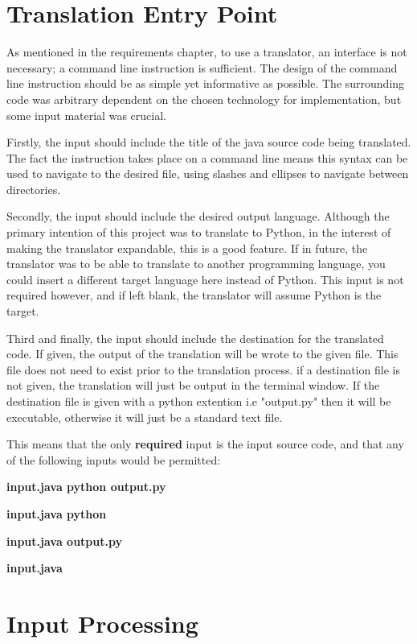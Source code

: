 \documentclass{l4proj}
\begin{document}
\section{Translation Entry Point}
As mentioned in the requirements chapter, to use a translator, an interface is not necessary; a command line instruction is sufficient. The design of the command line instruction should be as simple yet informative as possible. The surrounding code was arbitrary dependent on the chosen technology for implementation, but some input material was crucial. 

Firstly, the input should include the title of the java source code being translated. The fact the instruction takes place on a command line means this syntax can be used to navigate to the desired file, using slashes and ellipses to navigate between directories. 

Secondly, the input should include the desired output language. Although the primary intention of this project was to translate to Python, in the interest of making the translator expandable, this is a good feature. If in future, the translator was to be able to translate to another programming language, you could insert a different target language here instead of Python. This input is not required however, and if left blank, the translator will assume Python is the target.

Third and finally, the input should include the destination for the translated code. If given, the output of the translation will be wrote to the given file. This file does not need to exist prior to the translation process. if a destination file is not given, the translation will just be output in the terminal window. If the destination file is given with a python extention i.e "output.py" then it will be executable, otherwise it will just be a standard text file.

This means that the only \textbf{required} input is the input source code, and that any of the following inputs would be permitted:

\textbf{input.java python output.py}

\textbf{input.java python}

\textbf{input.java output.py}

\textbf{input.java}

\section{Input Processing}
\end{document}
